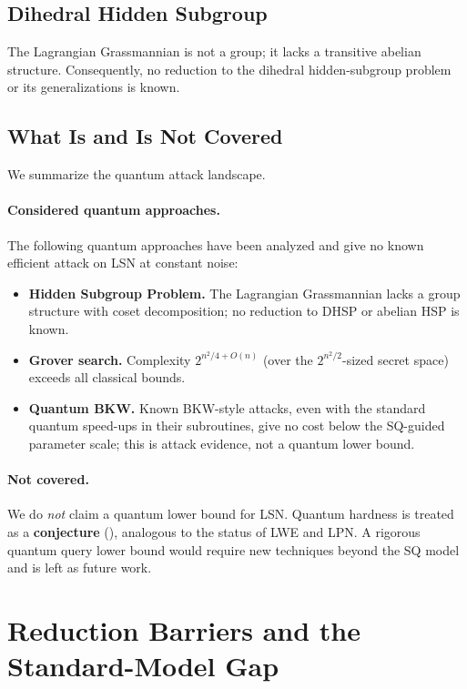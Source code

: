 \documentclass[11pt,a4paper]{article}
\theoremstyle{plain}
\theoremstyle{definition}
\begin{document}
\subsection{Dihedral Hidden Subgroup}
\label{subsec:dhsp}

The Lagrangian Grassmannian is not a group; it lacks a transitive abelian structure. Consequently, no reduction to the dihedral hidden-subgroup problem or its generalizations is known.

\subsection{What Is and Is Not Covered}
\label{subsec:quantum-covered}

We summarize the quantum attack landscape.

\paragraph{Considered quantum approaches.} The following quantum approaches have been analyzed and give no known efficient attack on LSN at constant noise:
\begin{itemize}
\item \textbf{Hidden Subgroup Problem.} The Lagrangian Grassmannian lacks a group structure with coset decomposition; no reduction to DHSP or abelian HSP is known.
\item \textbf{Grover search.} Complexity $2^{n^2/4 + O(n)}$ (over the $2^{n^2/2}$-sized secret space) exceeds all classical bounds.
\item \textbf{Quantum BKW.} Known BKW-style attacks, even with the standard quantum speed-ups in their subroutines, give no cost below the SQ-guided parameter scale; this is attack evidence, not a quantum lower bound.
\end{itemize}

\paragraph{Not covered.} We do \emph{not} claim a quantum lower bound for LSN. Quantum hardness is treated as a \textbf{conjecture} (), analogous to the status of LWE and LPN. A rigorous quantum query lower bound would require new techniques beyond the SQ model and is left as future work.

\section{Reduction Barriers and the Standard-Model Gap}
\label{sec:barriers}
\end{document}
